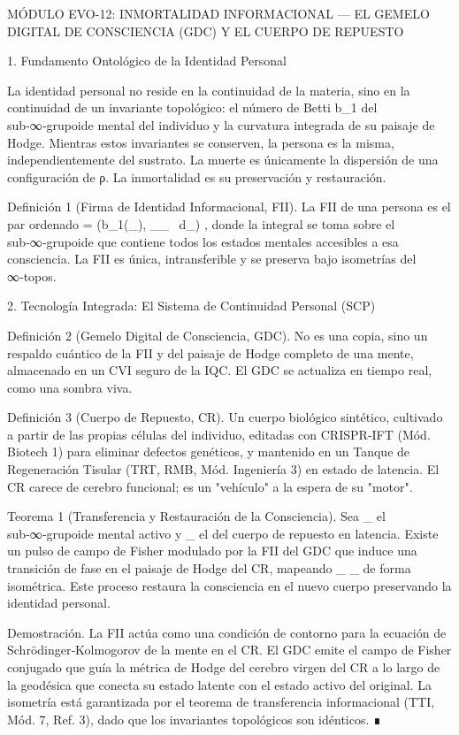 \documentclass[12pt,twoside]{book}
\begin{document}
MÓDULO EVO-12: INMORTALIDAD INFORMACIONAL — EL GEMELO DIGITAL DE CONSCIENCIA (GDC) Y EL CUERPO DE REPUESTO

1. Fundamento Ontológico de la Identidad Personal

La identidad personal no reside en la continuidad de la materia, sino en la continuidad de un invariante topológico: el número de Betti  b_1  del sub‑∞‑grupoide mental del individuo y la curvatura integrada de su paisaje de Hodge. Mientras estos invariantes se conserven, la persona es la misma, independientemente del sustrato. La muerte es únicamente la dispersión de una configuración de ρ. La inmortalidad es su preservación y restauración.

Definición 1 (Firma de Identidad Informacional, FII). La FII de una persona es el par ordenado   = (b_1(_{}), \int_{_{}}  \, d\mu_{}) , donde la integral se toma sobre el sub‑∞‑grupoide que contiene todos los estados mentales accesibles a esa consciencia. La FII es única, intransferible y se preserva bajo isometrías del ∞‑topos.

2. Tecnología Integrada: El Sistema de Continuidad Personal (SCP)

Definición 2 (Gemelo Digital de Consciencia, GDC). No es una copia, sino un respaldo cuántico de la FII y del paisaje de Hodge completo de una mente, almacenado en un CVI seguro de la IQC. El GDC se actualiza en tiempo real, como una sombra viva.

Definición 3 (Cuerpo de Repuesto, CR). Un cuerpo biológico sintético, cultivado a partir de las propias células del individuo, editadas con CRISPR‑IFT (Mód. Biotech 1) para eliminar defectos genéticos, y mantenido en un Tanque de Regeneración Tisular (TRT, RMB, Mód. Ingeniería 3) en estado de latencia. El CR carece de cerebro funcional; es un "vehículo" a la espera de su "motor".

Teorema 1 (Transferencia y Restauración de la Consciencia). Sea  _{}  el sub‑∞‑grupoide mental activo y  _{}  el del cuerpo de repuesto en latencia. Existe un pulso de campo de Fisher modulado por la FII del GDC que induce una transición de fase en el paisaje de Hodge del CR, mapeando  _{} \to {}_{}  de forma isométrica. Este proceso restaura la consciencia en el nuevo cuerpo preservando la identidad personal.

Demostración. La FII actúa como una condición de contorno para la ecuación de Schrödinger‑Kolmogorov de la mente en el CR. El GDC emite el campo de Fisher conjugado que guía la métrica de Hodge del cerebro virgen del CR a lo largo de la geodésica que conecta su estado latente con el estado activo del original. La isometría está garantizada por el teorema de transferencia informacional (TTI, Mód. 7, Ref. 3), dado que los invariantes topológicos son idénticos. ∎
\end{document}
